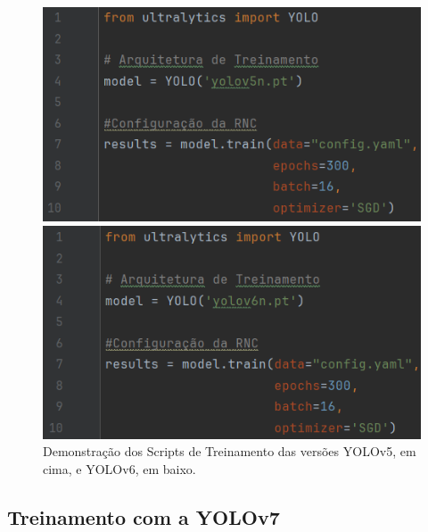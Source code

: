 \begin{figure}[!h]
    \centering
    \begin{minipage}[b]{0.49\linewidth}
        \centering
        \includegraphics[width=1\linewidth]{img/cap5/script-yolov5.png}
    \end{minipage}
    \hspace{0.05\linewidth}
    \begin{minipage}[b]{0.49\linewidth}
        \centering
        \includegraphics[width=1\linewidth]{img/cap5/script-yolov6.png}
    \end{minipage}
    \captionsetup{justification=centering,margin=0.5cm,font=small}
    \caption{Demonstração dos Scripts de Treinamento das versões YOLOv5, em cima, e YOLOv6, em baixo.}
    \label{fig:script-yolov5-6}
\end{figure}

\subsection{Treinamento com a YOLOv7}

